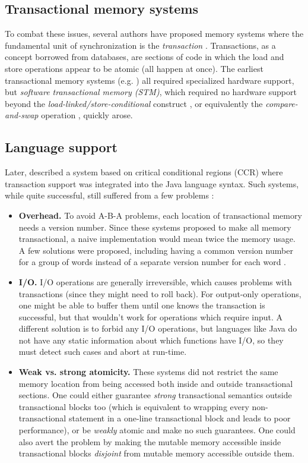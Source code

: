 \documentclass[a4paper]{acmtrans2m}
\begin{document}
\subsection{Transactional memory systems}
To combat these issues, several authors have proposed memory systems where the
fundamental unit of synchronization is the \textit{transaction}
\cite{Harris:2007}. Transactions, as a concept borrowed from databases, are
sections of code in which the load and store operations appear to be atomic (all
happen at once). The earliest transactional memory systems
(e.g. \cite{Herlihy:1993}) all required specialized hardware support, but
\textit{software transactional memory (STM)}, which required no hardware support
beyond the \textit{load-linked/store-conditional} construct \cite{Shavit:1995}, or
equivalently the \textit{compare-and-swap} operation \cite{Harris:2003}, quickly
arose.

\subsection{Language support}

Later,  described a system based on critical conditional
regions (CCR) \cite{Hoare:1972} where transaction support was integrated into
the Java language syntax. Such systems, while quite successful, still suffered
from a few problems \cite{Harris:2005,Duffy:2010}:

\begin{itemize}
\item \textbf{Overhead.} To avoid A-B-A problems, each location of transactional
  memory needs a version number. Since these systems proposed to make all memory
  transactional, a naive implementation would mean twice the memory usage. A few
  solutions were proposed, including having a common version number for a group
  of words instead of a separate version number for each word
  \cite{Harris:2003}.
\item \textbf{I/O.} I/O operations are generally irreversible, which causes
  problems with transactions (since they might need to roll back). For
  output-only operations, one might be able to buffer them until one knows the
  transaction is successful, but that wouldn't work for operations which require
  input. A different solution is to forbid any I/O operations, but languages
  like Java do not have any static information about which functions have I/O,
  so they must detect such cases and abort at run-time.
\item \textbf{Weak vs. strong atomicity.} These systems did not restrict the
  same memory location from being accessed both inside and outside transactional
  sections. One could either guarantee \textit{strong} transactional semantics
  outside transactional blocks too (which is equivalent to wrapping every
  non-transactional statement in a one-line transactional block and leads to
  poor performance), or be \textit{weakly} atomic and make no such
  guarantees. One could also avert the problem by making the mutable memory
  accessible inside transactional blocks \textit{disjoint} from mutable memory
  accessible outside them.
\end{itemize}
\end{document}
